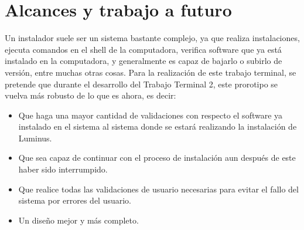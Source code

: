 \section{Alcances y trabajo a futuro}
Un instalador suele ser un sistema bastante complejo, ya que realiza instalaciones, ejecuta comandos en el shell de la computadora, verifica software que ya está instalado en la computadora, y generalmente es capaz de bajarlo o subirlo de versión, entre muchas otras cosas. Para la realización de este trabajo terminal, se pretende que durante el desarrollo del Trabajo Terminal 2, este prorotipo se vuelva más robusto de lo que es ahora, es decir:\\
\begin{itemize}
	\item Que haga una mayor cantidad de validaciones con respecto el software ya instalado en el sistema al sistema donde se estará realizando la instalación de Luminus.\\
	\item Que sea capaz de continuar con el proceso de instalación aun después de este haber sido interrumpido.\\
	\item Que realice todas las validaciones de usuario necesarias para evitar el fallo del sistema por errores del usuario.\\
	\item Un diseño mejor y más completo.\\
\end{itemize}

